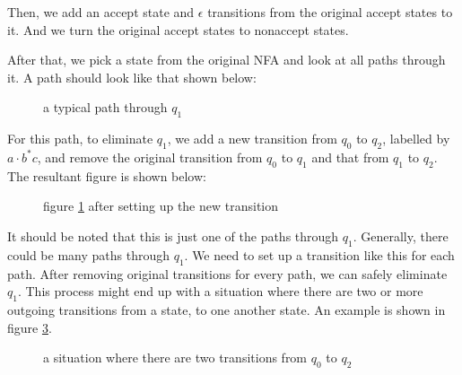 \documentclass[11pt]{article}
\begin{document}
Then, we add an accept state and $\epsilon$ transitions from the original
accept states to it. And we turn the original accept states to nonaccept
states.

After that, we pick a state from the original NFA and look at all paths
through it. A path should look like that shown below:

\begin{figure}[ht]
    \centering
    \caption{a typical path through $q_1$}
    \label{fig:fig23}
\end{figure}

For this path, to eliminate $q_1$, we add a new transition from $q_0$ to
$q_2$, labelled by $a \cdot b^\ast c$, and remove the original transition
from $q_0$ to $q_1$ and that from $q_1$ to $q_2$. The resultant figure is
shown below:

\begin{figure}[ht]
    \centering
    \caption{figure \ref{fig:fig23} after setting up the new transition}
    \label{fig:fig24}
\end{figure}

It should be noted that this is just one of the paths through $q_1$.
Generally, there could be many paths through $q_1$. We need to set up a
transition like this for each path. After removing original transitions
for every path, we can safely eliminate $q_1$. This process might end up
with a situation where there are two or more outgoing transitions from a
state, to one another state. An example is shown in figure \ref{fig:fig25}.

\begin{figure}[ht]
    \centering
    \caption{a situation where there are two transitions from $q_0$ to $q_2$}
    \label{fig:fig25}
\end{figure}
\end{document}
